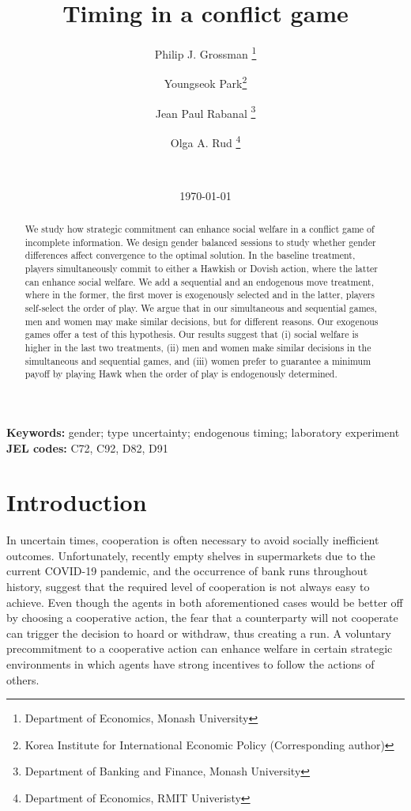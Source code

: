 \documentclass[12pt, letterpaper]{article}
\theoremstyle{plain}
\begin{document}
\newtheorem{Assumption}{Assumption}
\newtheorem{Proposition}{Proposition}
\newtheorem{Corollary}{Corollary}
\newtheorem{Hypothesis}{Hypothesis}
\newtheorem{Result}{Result}


\title{Timing in a conflict game}

\author{Philip J. Grossman
\footnote{Department of Economics, Monash University} \and Youngseok Park\thanks{Korea Institute for International Economic Policy (Corresponding author)} \and Jean Paul Rabanal
\thanks{Department of Banking and Finance, Monash University }
 \and Olga A. Rud \footnote{Department of Economics, RMIT Univeristy} \and  \ }
\date{\today}
\clearpage\maketitle
\thispagestyle{empty}

\begin{abstract}
We study how strategic commitment can enhance social welfare in a conflict game of incomplete information. We design gender balanced sessions to study whether gender differences affect convergence to the optimal solution. In the baseline treatment, players simultaneously commit to either a Hawkish or Dovish action, where the latter can enhance social welfare. We add a sequential and an endogenous move treatment, where in the former, the first mover is exogenously selected and in the latter, players self-select the order of play. We argue that in our simultaneous and sequential games, men and women may make similar decisions, but for different reasons. Our exogenous games offer a test of this
hypothesis. Our results suggest that (i) social welfare is higher in the last two treatments, (ii) men and women make similar decisions in the simultaneous and
sequential games, and (iii) women prefer to guarantee a minimum payoff by playing Hawk when the order of play is endogenously determined.

\end{abstract}
\textbf{Keywords:}
gender; type uncertainty; endogenous timing; laboratory experiment\\
\textbf{JEL codes:} C72, C92, D82, D91
\newpage
\section{Introduction}
\label{sec:intro}

In uncertain times, cooperation is often necessary to avoid socially inefficient outcomes. Unfortunately, recently empty shelves in supermarkets due to the current COVID-19 pandemic, and the occurrence of bank runs throughout history, suggest that the required level of cooperation is not always easy to achieve. Even though the agents in both aforementioned cases would be better off by choosing a cooperative action, the fear that a counterparty will not cooperate can trigger the decision to hoard or withdraw, thus creating a run. A voluntary precommitment to a cooperative action can enhance welfare in certain strategic environments in which agents have strong incentives to follow the actions of others. 
\end{document}
